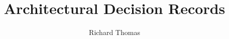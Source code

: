 \documentclass{csse4400}
\title{Architectural Decision Records}
\author{Richard Thomas}
\date{\week{2}}
\begin{document}
\makecover





\end{document}
